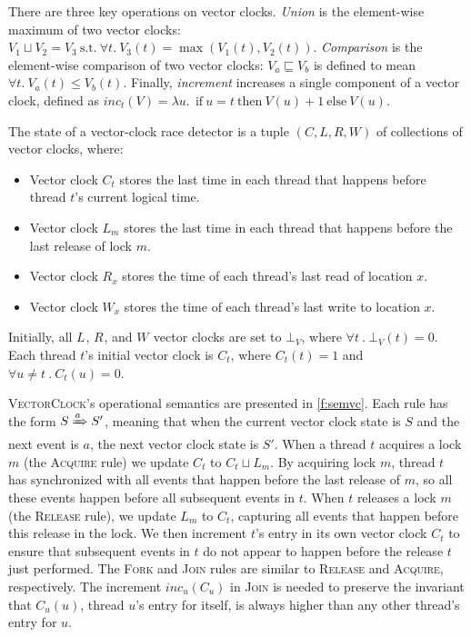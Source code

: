 \documentclass[preprint, 9pt]{sigplanconf}
\newcommand{\Tid}{t}
\newcommand{\TidU}{u}
\newcommand{\Address}{x}
\newcommand{\Lock}{m}
\newcommand{\VC}{V}
\newcommand{\VCFont}{}
\newcommand{\ThreadVC}[1]{\VCFont{C}_{#1}}
\newcommand{\LockVC}[1]{\VCFont{L}_{#1}}
\newcommand{\ReadVC}[1]{\VCFont{R}_{#1}}
\newcommand{\WriteVC}[1]{\VCFont{W}_{#1}}
\newcommand{\SuchThat}{\ \text{s.t.}\ }
\newcommand{\Bind}{\ .\ }
\newcommand{\VCalg}{\textsc{VectorClock}\xspace}
\newcommand{\Rule}[1]{\textsc{#1}}
\newcommand{\VCMax}{\sqcup}
\newcommand{\VCCompare}{\sqsubseteq}
\begin{document}
  There are three key operations on vector clocks.
\emph{Union} is the element-wise maximum of two vector clocks:
$\VC_1 \VCMax \VC_2 = \VC_3 \SuchThat \forall \Tid.\ \VC_3(\Tid) =
\max(\VC_1(\Tid), \VC_2(\Tid))$. \emph{Comparison} is the element-wise
comparison of two vector clocks: $\VC_a \VCCompare \VC_b$ is defined to mean $\forall
\Tid.\ \VC_a(\Tid) \leq \VC_b(\Tid)$.  Finally, \emph{increment} increases a single component of a vector clock, defined as $\mathit{inc}_t(V) = \lambda u.\ \mathrm{~if~} u=t \mathrm{~then~} V(u)+1 \mathrm{~else~} V(u)$.

The state of a vector-clock race detector is a tuple $(C, L, R, W)$ of collections of vector clocks, where:
\begin{itemize}
\item
 Vector clock $\ThreadVC{\Tid}$ stores the last time in each thread that happens before thread $\Tid$'s current logical time.
\item
 Vector clock $\LockVC{\Lock}$ stores the last time in each thread that happens before the last release of lock $\Lock$.  
\item
 Vector clock $\ReadVC{\Address}$ stores
  the time of each thread's last read of location $\Address$.
\item
 Vector clock $\WriteVC{\Address}$ stores
  the time of each thread's last write to location $\Address$.
\end{itemize}

Initially, all $\LockVC{}$, $\ReadVC{}$, and $\WriteVC{}$ vector clocks are
set to $\bot_V$, where $\forall \Tid \Bind \bot_V(\Tid) = 0$.  Each thread $\Tid$'s
initial vector clock is $\ThreadVC{\Tid}$, where $\ThreadVC{\Tid}(\Tid) = 1$
and $\forall \TidU \neq \Tid \Bind \ThreadVC{\Tid}(\TidU) = 0$.  

\VCalg's operational semantics are presented in \autoref{f:semvc}. Each rule has the form $S \xRightarrow{a} S'$, meaning that when the current vector clock state is $S$ and the next event is $a$, the next vector clock state is $S'$. When a thread $\Tid$ acquires a lock $\Lock$ (the \Rule{Acquire} rule) we update $\ThreadVC{\Tid}$ to $\ThreadVC{\Tid} \VCMax \LockVC{\Lock}$.  By acquiring lock $\Lock$, thread $\Tid$ has synchronized with all events that happen before the last release of $\Lock$, so all these events happen before all subsequent events in $\Tid$.  When $\Tid$ releases a lock $\Lock$ (the \Rule{Release} rule), we update $\LockVC{\Lock}$ to $\ThreadVC{\Tid}$, capturing all events that happen before this release in the lock.  We then increment $\Tid$'s entry in its own vector clock $\ThreadVC{\Tid}$ to ensure that subsequent events in $\Tid$ do not appear to happen before the release $\Tid$ just performed.  The \Rule{Fork} and \Rule{Join} rules are similar to \Rule{Release} and \Rule{Acquire}, respectively. The increment $\mathit{inc}_u(C_u)$ in \Rule{Join} is needed to preserve the invariant that $\ThreadVC{\TidU}(u)$, thread $\TidU$'s entry for itself, is always higher than any other thread's entry for $\TidU$.
\end{document}
